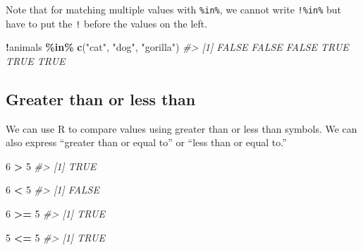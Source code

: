 \documentclass[
  12pt,
]{book}
\newenvironment{Shaded}{\begin{snugshade}}{\end{snugshade}}
\newcommand{\CommentTok}[1]{\textcolor[rgb]{0.56,0.35,0.01}{\textit{#1}}}
\newcommand{\DecValTok}[1]{\textcolor[rgb]{0.00,0.00,0.81}{#1}}
\newcommand{\KeywordTok}[1]{\textcolor[rgb]{0.13,0.29,0.53}{\textbf{#1}}}
\newcommand{\NormalTok}[1]{#1}
\newcommand{\OperatorTok}[1]{\textcolor[rgb]{0.81,0.36,0.00}{\textbf{#1}}}
\newcommand{\StringTok}[1]{\textcolor[rgb]{0.31,0.60,0.02}{#1}}
\begin{document}
Note that for matching multiple values with \texttt{\%in\%}, we cannot write \texttt{!\%in\%} but have to put the \texttt{!} before the values on the left.

\begin{Shaded}
\begin{Highlighting}[]
\OperatorTok{!}\NormalTok{animals }\OperatorTok{\%in\%}\StringTok{ }\KeywordTok{c}\NormalTok{(}\StringTok{"cat"}\NormalTok{, }\StringTok{"dog"}\NormalTok{, }\StringTok{"gorilla"}\NormalTok{)}
\CommentTok{\#> [1] FALSE FALSE FALSE  TRUE  TRUE  TRUE}
\end{Highlighting}
\end{Shaded}

\hypertarget{greater-than-or-less-than}{%
\subsection{Greater than or less than}\label{greater-than-or-less-than}}

We can use R to compare values using greater than or less than symbols. We can also express ``greater than or equal to'' or ``less than or equal to.''

\begin{Shaded}
\begin{Highlighting}[]
\DecValTok{6} \OperatorTok{>}\StringTok{ }\DecValTok{5}
\CommentTok{\#> [1] TRUE}
\end{Highlighting}
\end{Shaded}

\begin{Shaded}
\begin{Highlighting}[]
\DecValTok{6} \OperatorTok{<}\StringTok{ }\DecValTok{5}
\CommentTok{\#> [1] FALSE}
\end{Highlighting}
\end{Shaded}

\begin{Shaded}
\begin{Highlighting}[]
\DecValTok{6} \OperatorTok{>=}\StringTok{ }\DecValTok{5}
\CommentTok{\#> [1] TRUE}
\end{Highlighting}
\end{Shaded}

\begin{Shaded}
\begin{Highlighting}[]
\DecValTok{5} \OperatorTok{<=}\StringTok{ }\DecValTok{5}
\CommentTok{\#> [1] TRUE}
\end{Highlighting}
\end{Shaded}
\end{document}
